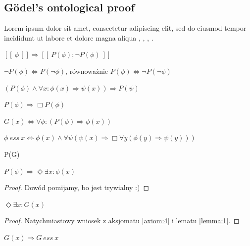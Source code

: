 \documentclass[
    left=2.5cm,         %
    right=2.5cm,        %
    top=2.5cm,          %
    bottom=3cm,         %
    bindingoffset=6mm,  %
    nohyphenation=true %
]{eiti/eiti-thesis} %
\begin{document}
\kant[9]

\subsection{G\"odel's ontological proof}
\kant[9] Lorem ipsum dolor sit amet, consectetur adipiscing elit, sed do eiusmod tempor incididunt ut labore et dolore magna aliqua \cite{benzmuller2014}, \cite{goedel95}, \cite{wang97}, \cite{koons2005}. 
\begin{assumption} \label{ass:1}
	$ [\![ \ \phi \ ]\!] \Longrightarrow [\![ \ P(\phi); \neg P(\phi) \ ]\!]$
\end{assumption}
\begin{axiom}[Dualność] \label{axiom:1}
	$\neg P(\phi) \Leftrightarrow P(\neg \phi)$, równoważnie $P(\phi) \Leftrightarrow \neg P(\neg \phi)$
\end{axiom}
\begin{axiom}[Całkowitość] \label{axiom:2}
	$ \left( P(\phi) \wedge \forall x: \phi(x) \Rightarrow \psi(x) \right) \Rightarrow P(\psi) $
\end{axiom}
\begin{axiom}[Absolutność] \label{axiom:3}
	$ P(\phi) \Rightarrow \Box P(\phi) $
\end{axiom}
\begin{definition} \label{def:1}
	$ G(x) \Leftrightarrow \forall \phi: \left( P(\phi) \Rightarrow \phi(x) \right) $
\end{definition}
\begin{definition} \label{def:2}
	$ \phi \ ess \ x \Leftrightarrow \phi(x) \wedge \forall \psi \left( \psi(x) \Rightarrow \Box \forall y \left( \phi(y) \Rightarrow \psi(y) \right) \right)  $
\end{definition}
\begin{axiom} \label{axiom:4}
	P(G)
\end{axiom}
\begin{lemma} \label{lemma:1}
	$ P(\phi) \Rightarrow \Diamond \exists x : \phi(x) $
\end{lemma}
\begin{proof}
	Dowód pomijamy, bo jest trywialny :)
\end{proof}
\begin{lemma} \label{lemma:2}
	$ \Diamond \exists x : G(x) $
\end{lemma}
\begin{proof}
	Natychmiastowy wniosek z aksjomatu \ref{axiom:4} i lematu \ref{lemma:1}.
\end{proof}
\begin{lemma} \label{lemma:3}
	$ G(x) \Rightarrow G \ ess \ x $
\end{lemma}
\end{document}
